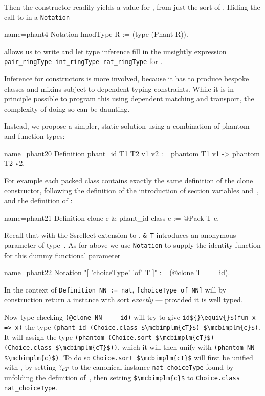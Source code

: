 Then the  constructor readily yields a value for ,
from just the sort of . Hiding the call to  in
a \lstinline/Notation/

\begin{coq}{name=phant4}{}
Notation lmodType R := (type (Phant R)).
\end{coq}

allows us to write  and let type inference
fill in the unsightly expression
\lstinline/pair_ringType int_ringType rat_ringType/ for .

Inference for constructors is more involved, because it has to produce
bespoke classes and mixins subject to dependent typing constraints.
While it is in principle possible to program this using dependent
matching and transport, the complexity of doing so can be daunting.

Instead, we propose a simpler, static solution using a combination
of phantom and function types:

\begin{coq}{name=phant20}{}
Definition phant_id T1 T2 v1 v2 := phantom T1 v1 -> phantom T2 v2.
\end{coq}

For example each packed class contains exactly the same definition of
the clone constructor, following the definition of the introduction of
section variables  and~, and the definition of :

\begin{coq}{name=phant21}{}
Definition clone c & phant_id class c := @Pack T c.
\end{coq}

Recall that with the {\sc Ssreflect} extension to \Coq{}, \lstinline/& T/
introduces an anonymous parameter of type~. As for 
above we use \lstinline/Notation/ to supply the identity function
for this dummy functional parameter

\begin{coq}{name=phant22}{}
Notation "[ 'choiceType' 'of' T ]" := (@clone T _ _ id).
\end{coq}

In the context of \lstinline/Definition NN := nat/,
\lstinline/[choiceType of NN]/ will by construction return a 
instance with sort \emph{exactly}  --- provided it is well typed.

Now type checking
\lstinline/(@clone NN _ _ id)/ will try to give
\lstinline/id${}\equiv{}$(fun x => x)/ the type
\lstinline/(phant_id (Choice.class $\mcbimplm{cT}$) $\mcbimplm{c}$)/.
It will assign  the type
\lstinline/(phantom (Choice.sort $\mcbimplm{cT}$) (Choice.class $\mcbimplm{cT}$))/,
which it will then unify with \lstinline/(phantom NN $\mcbimplm{c}$)/.
To do so \lstinline/Choice.sort $\mcbimplm{cT}$/
will first be unified with ,
by setting $\mbox{?}_{cT}$ to the canonical instance
\lstinline/nat_choiceType/ found by unfolding the definition of~,
then setting \lstinline/$\mcbimplm{c}$/
to \lstinline/Choice.class nat_choiceType/.

